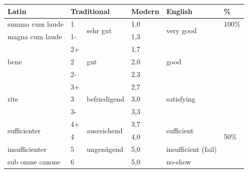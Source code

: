 
\begin{tabular}{llllll}
\toprule
Latin & \multicolumn{2}{l}{Traditional} & Modern & English  & \% \\
\midrule \midrule
    summa cum laude & 1 & \multirow{2}{*}{sehr gut} & 1,0 & \multirow{2}{*}{very good}  & 100\% \\
    magna cum laude & 1- &   & 1,3 &    & \\
    \midrule
    \multirow{3}{*}{bene} & 2+ & \multirow{3}{*}{gut} & 1,7 &  \multirow{3}{*}{good} & \\
     & 2 &   & 2,0 &   & \\
     & 2- &   & 2,3 &   & \\
     \midrule
    \multirow{3}{*}{rite} & 3+ & \multirow{3}{*}{befriedigend} & 2,7 & \multirow{3}{*}{satisfying} & \\
     & 3 & & 3,0 &  & \\
     & 3- &  & 3,3 &  & \\
     \midrule
    \multirow{2}{*}{sufficienter} & 4+ & \multirow{2}{*}{ausreichend} & 3,7 & \multirow{2}{*}{sufficient} & \\
     & 4 &  & 4,0 &  & 50\%\\
    \midrule
    \midrule
    insufficienter & 5 & ungenügend & 5,0 & insufficient (fail)& \\
    \midrule
    sub omne canone & 6 &  & 5,0 & no-show & \\
    \bottomrule
\end{tabular}
